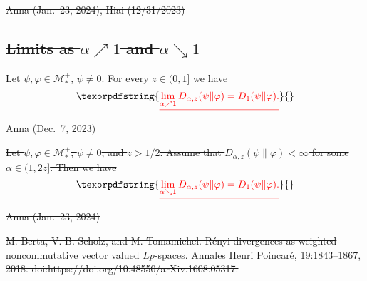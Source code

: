 \documentclass[12pt]{article}
\newtheorem{theorem}{Theorem}[section]
\theoremstyle{definition}
\theoremstyle{remark}
\def\Me{\mathcal M}
\def\ffi{\varphi}
\providecommand{\DIFdeltex}[1]{{\protect\color{red}\sout{#1}}}                      %
\providecommand{\DIFdel}[1]{\texorpdfstring{\DIFdeltex{#1}}{}} %
\begin{document}
\DIFdel{Anna (Jan.\ 23, 2024), Hiai (12/31/2023)}%

\subsection{\DIFdel{Limits as $\alpha\nearrow1$ and $\alpha\searrow1$}}
\addtocounter{subsection}{-1}%

\DIFdel{Let $\psi,\ffi\in\Me_*^+$, $\psi\ne0$. For every $z\in(0,1]$ we have
}\[
\DIFdel{\lim_{\alpha\nearrow1}D_{\alpha,z}(\psi\|\ffi)=D_1(\psi\|\ffi).
}\]%
\DIFdel{Anna (Dec.\ 7, 2023)}%

\DIFdel{Let $\psi,\ffi\in\Me_*^+$, $\psi\ne0$, and $z>1/2$. Assume that $D_{\alpha,z}(\psi\|\ffi)<\infty$ for some
$\alpha\in(1,2z]$. Then we have
}\[
\DIFdel{\lim_{\alpha\searrow1}D_{\alpha,z}(\psi\|\ffi)=D_1(\psi\|\ffi).
}\]%
\DIFdel{Anna (Jan.\ 23, 2024)}%

\DIFdel{M. Berta, V. B. Scholz, and M. Tomamichel. R\'enyi divergences as
weighted noncommutative
vector valued $Lp$-spaces. Annales Henri Poincar\'e, 19:1843--1867, 2018.
doi:https://doi.org/10.48550/arXiv.1608.05317.
}%
\end{document}
